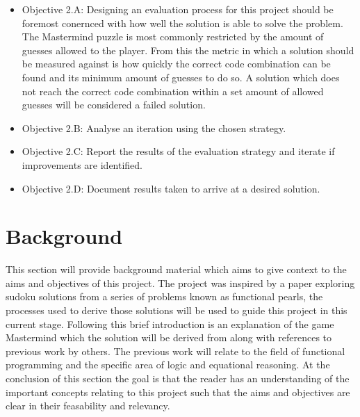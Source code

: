 \documentclass[12pt]{article}  %
\theoremstyle{definition}
\theoremstyle{remark}
\begin{document}
\begin {itemize}
	\begin {itemize}
	\item{Objective 2.A: Designing an evaluation process for this project should be foremost conernced with how well the solution is able to solve the problem. The Mastermind puzzle is most commonly restricted by the amount of guesses allowed to the player. From this the metric in which a solution should be measured against is how quickly the correct code combination can be found and its minimum amount of guesses to do so. A solution which does not reach the correct code combination within a set amount of allowed guesses will be considered a failed solution.}
	\item{Objective 2.B: Analyse an iteration using the chosen strategy.}
	\item{Objective 2.C: Report the results of the evaluation strategy and iterate if improvements are identified.}
	\item{Objective 2.D: Document results taken to arrive at a desired solution.}   
	\end {itemize}
\end {itemize}


%

\newpage                     %
\section{Background}\label{ss:back}

This section will provide background material which aims to give context to the aims and objectives of this project. The project was inspired by a paper exploring sudoku solutions from a series of problems known as functional pearls, the processes used to derive those solutions will be used to guide this project in this current stage. Following this brief introduction is an explanation of the game Mastermind which the solution will be derived from along with references to previous work by others. The previous work will relate to the field of functional programming and the specific area of logic and equational reasoning. At the conclusion of this section the goal is that the reader has an understanding of the important concepts relating to this project such that the aims and objectives are clear in their feasability and relevancy.
\end{document}
